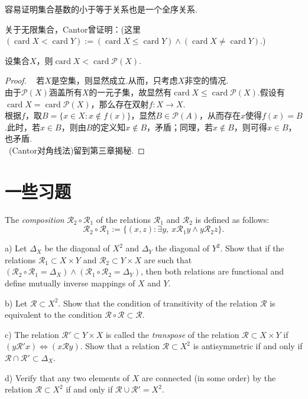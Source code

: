 \documentclass[lang=cn, zihao=5]{elegantbook}
\DeclareMathOperator{\card}{card}
\begin{document}
容易证明集合基数的小于等于关系也是一个全序关系.

关于无限集合，Cantor曾证明：(这里$(\card X < \card Y):= (\card X \leq \card Y) \wedge (\card X \neq \card Y)$.)

\begin{theorem}
	设集合$X$，则$\card X < \card \mathcal{P}(X)$.
\end{theorem}
\begin{proof}
	~
	若$X$是空集，则显然成立.从而，只考虑$X$非空的情况. \\
	由于$\mathcal{P}(X)$涵盖所有$X$的一元子集，故显然有$\card X \leq \card \mathcal{P}(X)$.假设有$\card X = \card \mathcal{P}(X)$，那么存在双射$f:X \to X$. \\
	根据$f$，取$B=\{ x \in X:x \notin f(x) \}$，显然$B \in \mathcal{P}(A)$，从而存在$x$使得$f(x)=B$.此时，若$x \in B$，则由$B$的定义知$x \notin B$，矛盾；同理，若$x \notin B$，则可得$x \in B$，也矛盾. \\
	~(Cantor对角线法)留到第三章揭秘.
\end{proof}

\section*{一些习题}

\begin{exercise}
	The \textit{composition} $\mathcal{R}_2 \circ \mathcal{R}_1$ of the relations $\mathcal{R}_1$ and $\mathcal{R}_2$ is defined as follows:$$\mathcal{R}_2 \circ \mathcal{R}_1 := \{ (x,z):\exists y,~x \mathcal{R}_1 y \wedge y \mathcal{R}_2 z \}.$$
	
	a) Let $\Delta _X$ be the diagonal of $X^2$ and $\Delta _Y$ the diagonal of $Y^2$.  Show that if the relations $\mathcal{R}_1 \subset X \times Y$ and $\mathcal{R}_2 \subset Y \times X$ are such that $(\mathcal{R}_2 \circ \mathcal{R}_1 = \Delta _X) \wedge (\mathcal{R}_1 \circ \mathcal{R}_2 = \Delta _Y)$, then both relations are functional and define mutually inverse mappings of $X$ and $Y$.
	
	b) Let $\mathcal{R} \subset X^2$. Show that the condition of transitivity of the relation $\mathcal{R}$ is equivalent to the condition $\mathcal{R} \circ \mathcal{R} \subset \mathcal{R}$. 
	
	c) The relation $\mathcal{R}' \subset Y \times X$ is called the \textit{transpose} of the relation $\mathcal{R} \subset X \times Y$ if $(y\mathcal{R}' x) \Leftrightarrow (x\mathcal{R} y)$. Show that a relation $\mathcal{R} \subset X^2$ is antisymmetric if and only if $\mathcal{R} \cap \mathcal{R}' \subset \Delta _X$. 
	
	d) Verify that any two elements of $X$ are connected (in some order) by the relation $\mathcal{R} \subset X^2$ if and only if $\mathcal{R} \cup \mathcal{R}' = X^2$.
\end{exercise}
\end{document}
